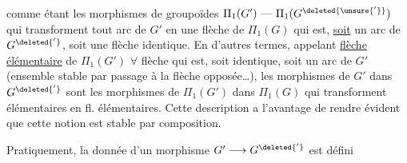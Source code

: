 comme étant les morphismes de groupoïdes $\Pi_1(G')\ \text{---}\ \Pi_1(G^{\deleted{\unsure{'}}})$ qui transforment tout arc de $G'$ en une flèche de $\Pi_1(G)$ qui est, \uline{soit} un arc de $G^{\deleted{'}}$, soit une flèche identique. En d'autres termes, appelant \uline{flèche élémentaire} de $\Pi_1(G')$ $\forall$ flèche qui est, soit identique, soit un arc de $G'$ (ensemble  stable par passage à la flèche opposée\ldots), les morphismes   de $G'$ dans $G^{\deleted{'}}$ sont les morphismes de $\Pi_1(G')$ dans $\Pi_1(G)$ qui transforment  élémentaires en fl. élémentaires. Cette description a l'avantage de rendre évident que cette notion est stable par composition.

Pratiquement, la donnée d'un morphisme    $G'\longrightarrow G^{\deleted{'}}$ est défini

